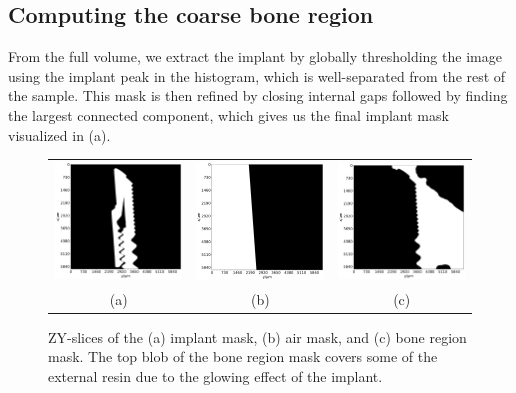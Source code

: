 \subsection{Computing the coarse bone region}
From the full volume, we extract the implant by globally thresholding the image
using the implant peak in the histogram, which is well-separated from the rest
of the sample. This mask is then refined by closing internal gaps followed by
finding the largest connected component, which gives us the final implant mask
visualized in  (a).

\begin{figure}
    \centering
    \begin{tabular}{ccc}
        \includegraphics[width=.31\linewidth]{generated/770c_pag_mask_implant_zy.pdf} &
        \includegraphics[width=.31\linewidth]{generated/770c_pag_mask_cut_cylinder_air_zy.pdf} &
        \includegraphics[width=.31\linewidth]{generated/770c_pag_mask_bone_region_zy.pdf} \\
        (a) & (b) & (c)
    \end{tabular}
    \caption{
        ZY-slices of the (a) implant mask, (b) air mask, and (c) bone region
        mask. The top blob of the bone region mask covers some of the external
        resin due to the glowing effect of the implant.
    }
    \label{fig:bone_region}
\end{figure}

